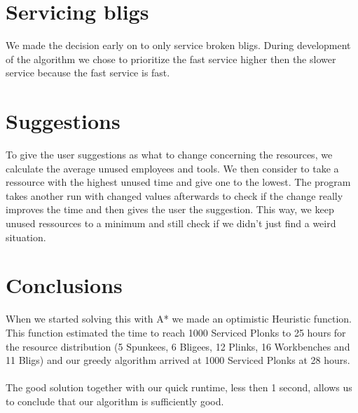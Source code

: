 \documentclass{article}
\begin{document}
\section*{Servicing bligs}
We made the decision early on to only service broken bligs. During development of the algorithm we chose to prioritize the fast service higher then the slower service because the fast service is fast.

\section*{Suggestions}
To give the user suggestions as what to change concerning the resources, we calculate the average unused employees and tools. We then consider to take a ressource with the highest unused time and give one to the lowest. The program takes another run with changed values afterwards to check if the change really improves the time and then gives the user the suggestion.
This way, we keep unused ressources to a minimum and still check if we didn't just find a weird situation.

\section*{Conclusions}
When we started solving this with A* we made an optimistic Heuristic function. This function estimated the time to reach 1000 Serviced Plonks to 25 hours for the resource distribution (5 Spunkees, 6 Bligees, 12 Plinks, 16 Workbenches and 11 Bligs) and our greedy algorithm arrived at 1000 Serviced Plonks at 28 hours.
\\ \\
The good solution together with our quick runtime, less then 1 second, allows us to conclude that our algorithm is sufficiently good.
\end{document}
